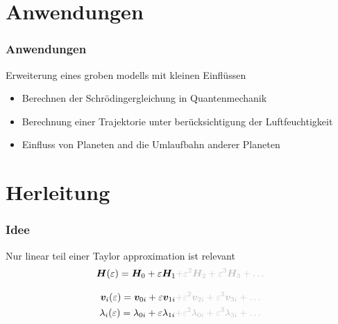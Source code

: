 \documentclass[ngerman, aspectratio=169]{beamer}
\newcommand*{\GR}{\textcolor{lightgray}}
\begin{document}
	\section{Anwendungen}

	\begin{frame}
        \frametitle{Anwendungen}

        \begin{block}{Erweiterung eines groben modells mit kleinen Einflüssen}
            \begin{itemize}
                \item Berechnen der Schrödingergleichung in Quantenmechanik %
                \item Berechnung einer Trajektorie unter berücksichtigung der Luftfeuchtigkeit
                \item Einfluss von Planeten and die Umlaufbahn anderer Planeten
			\end{itemize}
        \end{block}

	\end{frame}


	\section{Herleitung}

	\begin{frame}
        \frametitle{Idee}

        \begin{block}{Nur linear teil einer Taylor approximation ist relevant}
            \begin{equation*}
				\bm H(\varepsilon) = \bm H_0 + \varepsilon \bm H_1 \GR{ + \varepsilon^2 \bm H_2  + \varepsilon^3 \bm H_3 + \dots}
			\end{equation*}

			\begin{align*}
				\bm v_i(\varepsilon) = \bm v_{0i} + \varepsilon \bm v_{1i} \GR{ + \varepsilon^2 \bm v_{2i}  + \varepsilon^3 \bm v_{3i} + \dots} \\
				\lambda_i(\varepsilon) = \lambda_{0i} + \varepsilon \lambda_{1i} \GR{ + \varepsilon^2 \lambda_{0i}  + \varepsilon^3 \lambda_{3i} + \dots}
			\end{align*}
        \end{block}

	\end{frame}
\end{document}
